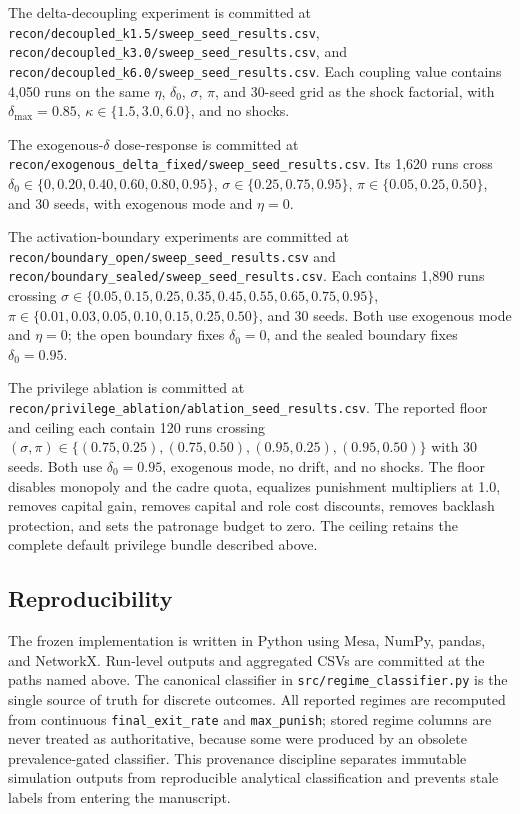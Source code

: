 \documentclass[12pt]{article}
\begin{document}
The delta-decoupling experiment is committed at \texttt{recon/decoupled\_k1.5/sweep\_seed\_results.csv}, \texttt{recon/decoupled\_k3.0/sweep\_seed\_results.csv}, and \texttt{recon/decoupled\_k6.0/sweep\_seed\_results.csv}. Each coupling value contains 4,050 runs on the same \(\eta\), \(\delta_0\), \(\sigma\), \(\pi\), and 30-seed grid as the shock factorial, with \(\delta_{\max}=0.85\), \(\kappa\in\{1.5,3.0,6.0\}\), and no shocks.

The exogenous-\(\delta\) dose-response is committed at \texttt{recon/exogenous\_delta\_fixed/sweep\_seed\_results.csv}. Its 1,620 runs cross \(\delta_0\in\{0,0.20,0.40,0.60,0.80,0.95\}\), \(\sigma\in\{0.25,0.75,0.95\}\), \(\pi\in\{0.05,0.25,0.50\}\), and 30 seeds, with exogenous mode and \(\eta=0\).

The activation-boundary experiments are committed at \texttt{recon/boundary\_open/sweep\_seed\_results.csv} and \texttt{recon/boundary\_sealed/sweep\_seed\_results.csv}. Each contains 1,890 runs crossing \(\sigma\in\{0.05,0.15,0.25,0.35,0.45,0.55,0.65,0.75,0.95\}\), \(\pi\in\{0.01,0.03,0.05,0.10,0.15,0.25,0.50\}\), and 30 seeds. Both use exogenous mode and \(\eta=0\); the open boundary fixes \(\delta_0=0\), and the sealed boundary fixes \(\delta_0=0.95\).

The privilege ablation is committed at \texttt{recon/privilege\_ablation/ablation\_seed\_results.csv}. The reported floor and ceiling each contain 120 runs crossing \((\sigma,\pi)\in\{(0.75,0.25),(0.75,0.50),(0.95,0.25),(0.95,0.50)\}\) with 30 seeds. Both use \(\delta_0=0.95\), exogenous mode, no drift, and no shocks. The floor disables monopoly and the cadre quota, equalizes punishment multipliers at 1.0, removes capital gain, removes capital and role cost discounts, removes backlash protection, and sets the patronage budget to zero. The ceiling retains the complete default privilege bundle described above.

\subsection{Reproducibility}

The frozen implementation is written in Python using Mesa, NumPy, pandas, and NetworkX. Run-level outputs and aggregated CSVs are committed at the paths named above. The canonical classifier in \texttt{src/regime\_classifier.py} is the single source of truth for discrete outcomes. All reported regimes are recomputed from continuous \texttt{final\_exit\_rate} and \texttt{max\_punish}; stored regime columns are never treated as authoritative, because some were produced by an obsolete prevalence-gated classifier. This provenance discipline separates immutable simulation outputs from reproducible analytical classification and prevents stale labels from entering the manuscript.
\end{document}
